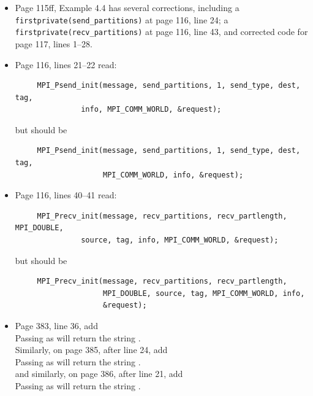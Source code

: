 \begin{itemize}
\item Page 115ff, Example 4.4 has several corrections, including
                    a \texttt{firstprivate(send\_partitions)} at page
                    116, line 24;
                    a \texttt{firstprivate(recv\_partitions)} at page
                    116, line 43, and corrected code for page 117,
                    lines 1--28.
\item Page 116, lines 21--22 read:
\begin{verbatim}
     MPI_Psend_init(message, send_partitions, 1, send_type, dest, tag,
               info, MPI_COMM_WORLD, &request);
\end{verbatim}
but should be
\begin{verbatim}
     MPI_Psend_init(message, send_partitions, 1, send_type, dest, tag,
                    MPI_COMM_WORLD, info, &request);
\end{verbatim}

\item Page 116, lines 40--41 read:
\begin{verbatim}
     MPI_Precv_init(message, recv_partitions, recv_partlength, MPI_DOUBLE,
               source, tag, info, MPI_COMM_WORLD, &request);
\end{verbatim}
but should be
\begin{verbatim}
     MPI_Precv_init(message, recv_partitions, recv_partlength,
                    MPI_DOUBLE, source, tag, MPI_COMM_WORLD, info,
                    &request);
\end{verbatim}

\item Page 383, line 36, add\\

Passing  as  will return the string
.\\

Similarly, on page 385, after line 24, add\\

Passing  as  will return the string
.\\

and similarly, on page 386, after line 21, add\\

Passing  as  will
return the string .



\end{itemize}
